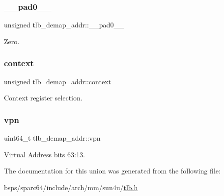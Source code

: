 \subsubsection{\texorpdfstring{\_\_pad0\_\_}{\_\_pad0\_\_}}
{\footnotesize\ttfamily unsigned tlb\+\_\+demap\+\_\+addr\+::\+\_\+\+\_\+pad0\+\_\+\+\_\+}

Zero. \mbox{\label{uniontlb__demap__addr_a7cd2950bb8e1b8b979f965ddc266c6aa}} 
\subsubsection{\texorpdfstring{context}{context}}
{\footnotesize\ttfamily unsigned tlb\+\_\+demap\+\_\+addr\+::context}

Context register selection. \mbox{\label{uniontlb__demap__addr_ae3d5881a6f0fc81a418ecd7f51bfeb47}} 
\subsubsection{\texorpdfstring{vpn}{vpn}}
{\footnotesize\ttfamily uint64\+\_\+t tlb\+\_\+demap\+\_\+addr\+::vpn}

Virtual Address bits 63\+:13. 

The documentation for this union was generated from the following file\+:\begin{DoxyCompactItemize}
\item 
bsps/sparc64/include/arch/mm/sun4u/\mbox{\hyperlink{sun4u_2tlb_8h}{tlb.\+h}}\end{DoxyCompactItemize}
